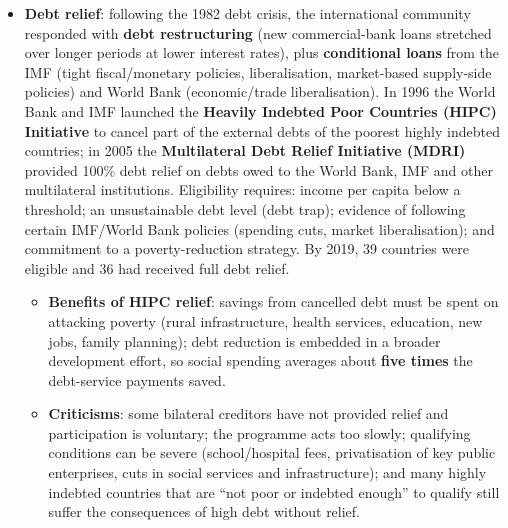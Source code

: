 \documentclass[a4paper,12pt]{article}
\begin{document}
\begin{itemize}
  \item \textbf{Debt relief}: following the 1982 debt crisis, the international community responded with \textbf{debt restructuring} (new commercial-bank loans stretched over longer periods at lower interest rates), plus \textbf{conditional loans} from the IMF (tight fiscal/monetary policies, liberalisation, market-based supply-side policies) and World Bank (economic/trade liberalisation). In 1996 the World Bank and IMF launched the \textbf{Heavily Indebted Poor Countries (HIPC) Initiative} to cancel part of the external debts of the poorest highly indebted countries; in 2005 the \textbf{Multilateral Debt Relief Initiative (MDRI)} provided 100\% debt relief on debts owed to the World Bank, IMF and other multilateral institutions. Eligibility requires: income per capita below a threshold; an unsustainable debt level (debt trap); evidence of following certain IMF/World Bank policies (spending cuts, market liberalisation); and commitment to a poverty-reduction strategy. By 2019, 39 countries were eligible and 36 had received full debt relief.
  \begin{itemize}
    \item \textbf{Benefits of HIPC relief}: savings from cancelled debt must be spent on attacking poverty (rural infrastructure, health services, education, new jobs, family planning); debt reduction is embedded in a broader development effort, so social spending averages about \textbf{five times} the debt-service payments saved.
    \item \textbf{Criticisms}: some bilateral creditors have not provided relief and participation is voluntary; the programme acts too slowly; qualifying conditions can be severe (school/hospital fees, privatisation of key public enterprises, cuts in social services and infrastructure); and many highly indebted countries that are ``not poor or indebted enough'' to qualify still suffer the consequences of high debt without relief.
  \end{itemize}
\end{itemize}
\end{document}
